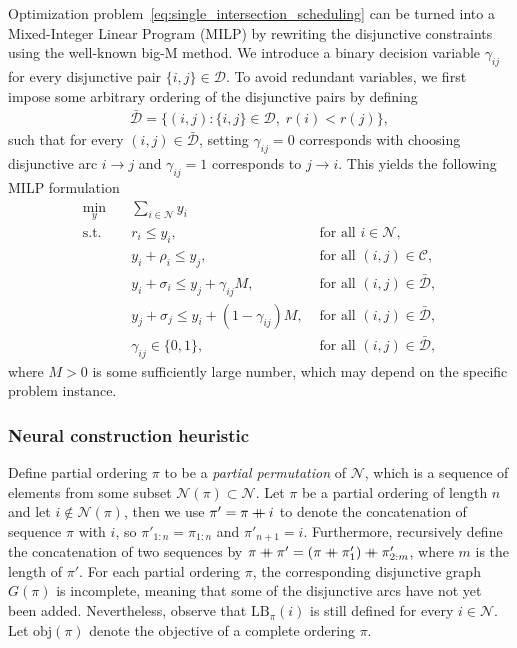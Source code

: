 \documentclass{article}
\newcommand\mdoubleplus{\mathbin{+\mkern-10mu+}}
\theoremstyle{definition}
\theoremstyle{plain}
\begin{document}
Optimization problem~\eqref{eq:single_intersection_scheduling} can be turned into
a Mixed-Integer Linear Program (MILP) by rewriting the disjunctive constraints using
the well-known big-M method.
%
We introduce a binary decision variable $\gamma_{ij}$ for every
disjunctive pair $\{i, j\} \in \mathcal{D}$.
%
To avoid redundant variables, we first impose some arbitrary ordering of the
disjunctive pairs by defining
\begin{align*}
  \bar{\mathcal{D}} = \{ (i,j) : \{i,j\} \in \mathcal{D}, \; r(i) < r(j) \} ,
\end{align*}
such that for every $(i,j) \in \bar{\mathcal{D}}$, setting $\gamma_{ij} = 0$
corresponds with choosing disjunctive arc $i \rightarrow j$ and
$\gamma_{ij} = 1$ corresponds to $j \rightarrow i$. This yields the following
MILP formulation
%
\begin{align*}
  \min_{y} \quad & \sum_{i \in \mathcal{N}} y_{i} & \\
  \text{s.t.} \quad & r_{i} \leq y_{i}, & \text{ for all } i \in \mathcal{N} , \\
  & y_{i} + \rho_{i} \leq y_{j}, & \text{ for all } (i,j) \in \mathcal{C} , \label{eq:conjunctions} \\
  & y_{i} + \sigma_{i} \leq y_{j} + \gamma_{ij}M, & \text{ for all } (i,j) \in \bar{\mathcal{D}} , \\
  & y_{j} + \sigma_{j} \leq y_{i} + (1 - \gamma_{ij})M, & \text{ for all } (i,j) \in \bar{\mathcal{D}} , \\
  & \gamma_{ij} \in \{0, 1\}, & \text{ for all } (i,j) \in \bar{\mathcal{D}} ,
\end{align*}
where $M > 0$ is some sufficiently large number, which may depend on the
specific problem instance.


\subsubsection{Neural construction heuristic}

Define partial ordering $\pi$ to be a \textit{partial permutation} of
$\mathcal{N}$, which is a sequence of elements from some subset
$\mathcal{N}(\pi) \subset \mathcal{N}$.
%
Let $\pi$ be a partial ordering of length $n$ and let
$i \notin \mathcal{N}(\pi)$, then we use $\pi' = \pi \mdoubleplus i$ to denote
the concatenation of sequence $\pi$ with $i$, so $\pi'_{1:n} = \pi_{1:n}$ and
$\pi'_{n+1} = i$. Furthermore, recursively define the concatenation of two
sequences by
$\pi \mdoubleplus \pi' = ( \pi \mdoubleplus \pi'_{1} ) \mdoubleplus \pi'_{2:m}$,
where $m$ is the length of $\pi'$.
%
For each partial ordering $\pi$, the corresponding disjunctive graph $G(\pi)$ is
incomplete, meaning that some of the disjunctive arcs have not yet been added.
Nevertheless, observe that $\text{LB}_{\pi}(i)$ is still defined for every
$i \in \mathcal{N}$.
%
Let $\text{obj}(\pi)$ denote the objective of a complete ordering $\pi$.
\end{document}
